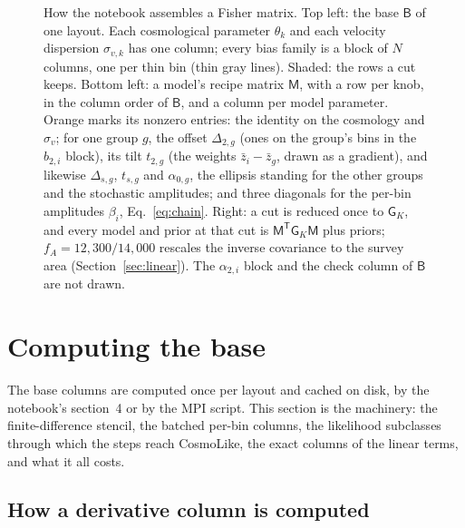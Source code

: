 \documentclass[11pt]{article}
\newcommand{\T}{^{\mathsf{T}}}
\newcommand{\mB}{\mathsf{B}}
\newcommand{\mM}{\mathsf{M}}
\newcommand{\mD}{\mathsf{D}}
\newcommand{\mG}{\mathsf{G}}
\begin{document}
\begin{figure}[tbp]
  \caption{How the notebook assembles a Fisher matrix.  Top left: the
    base $\mB$ of one layout.  Each cosmological parameter $\theta_k$ and
    each velocity dispersion $\sigma_{v,k}$ has one column; every bias
    family is a block of $N$ columns, one per thin bin (thin gray
    lines).  Shaded: the rows a cut keeps.  Bottom left: a model's
    recipe matrix $\mM$, with a row per knob, in the column order of
    $\mB$, and a column per model parameter.  Orange marks its nonzero
    entries: the identity on the cosmology and $\sigma_v$; for one group
    $g$, the offset $\Delta_{2,g}$ (ones on the group's bins in the
    $b_{2,i}$ block), its tilt $t_{2,g}$ (the weights
    $\bar{z}_i - \bar{z}_g$, drawn as a gradient), and likewise
    $\Delta_{s,g}$, $t_{s,g}$ and $\alpha_{0,g}$, the ellipsis standing
    for the other groups and the stochastic amplitudes; and three
    diagonals for the per-bin amplitudes $\beta_i$,
    Eq.~\eqref{eq:chain}.  Right: a cut
    is reduced once to $\mG_K$, and every model and prior at that cut is
    $\mM\T\mG_K\mM$ plus priors; $f_A = 12{,}300/14{,}000$ rescales
    the inverse covariance to the survey area
    (Section~\ref{sec:linear}).  The $\alpha_{2,i}$ block and the
    check column of $\mB$ are not drawn.}
  \label{fig:schematic}
\end{figure}

\section{Computing the base}
\label{sec:compute}

The base columns are computed once per layout and cached on disk, by
the notebook's section~4 or by the MPI script.  This section is the
machinery: the finite-difference stencil, the batched per-bin columns,
the likelihood subclasses through which the steps reach CosmoLike, the
exact columns of the linear terms, and what it all costs.

\subsection{How a derivative column is computed}
\label{sec:stencil}
\end{document}
